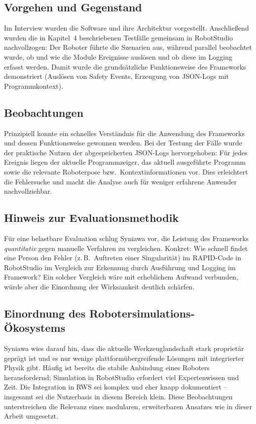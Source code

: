 \subsection{Vorgehen und Gegenstand}

Im Interview wurden die Software und ihre Architektur vorgestellt. Anschließend
wurden die in Kapitel~4 beschriebenen Testfälle gemeinsam in RobotStudio
nachvollzogen: Der Roboter führte die Szenarien aus, während parallel beobachtet
wurde, ob und wie die Module Ereignisse auslösen und ob diese im Logging erfasst
werden. Damit wurde die grundsätzliche Funktionsweise des Frameworks
demonstriert (Auslösen von Safety Events, Erzeugung von JSON-Logs mit
Programmkontext).

\subsection{Beobachtungen}

Prinzipiell konnte ein schnelles Verständnis für die Anwendung des Frameworks
und dessen Funktionsweise gewonnen werden. Bei der Testung der Fälle wurde der
praktische Nutzen der abgespeicherten JSON-Logs hervorgehoben: Für jedes
Ereignis liegen der aktuelle Programmzeiger, das aktuell ausgeführte Programm
sowie die relevante Roboterpose bzw.\ Kontextinformationen vor. Dies erleichtert
die Fehlersuche und macht die Analyse auch für weniger erfahrene Anwender
nachvollziehbar.

\subsection{Hinweis zur Evaluationsmethodik}

Für eine belastbare Evaluation schlug Syniawa vor, die Leistung des Frameworks
\emph{quantitativ} gegen manuelle Verfahren zu vergleichen. Konkret: Wie schnell
findet eine Person den Fehler (z.\,B.\ Auftreten einer Singularität) im
RAPID-Code in RobotStudio im Vergleich zur Erkennung durch Ausführung und
Logging im Framework? Ein solcher Vergleich wäre mit erheblichem Aufwand
verbunden, würde aber die Einordnung der Wirksamkeit deutlich schärfen.

\subsection{Einordnung des Robotersimulations-Ökosystems}

Syniawa wies darauf hin, dass die aktuelle Werkzeuglandschaft stark proprietär
geprägt ist und es nur wenige plattformübergreifende Lösungen mit integrierter
Physik gibt. Häufig ist bereits die stabile Anbindung eines Roboters
herausfordernd; Simulation in RobotStudio erfordert viel Expertenwissen
und Zeit. Die Integration in RWS sei komplex und eher knapp
dokumentiert – insgesamt sei die Nutzerbasis in diesem Bereich klein. Diese
Beobachtungen unterstreichen die Relevanz eines modularen, erweiterbaren
Ansatzes wie in dieser Arbeit umgesetzt.


